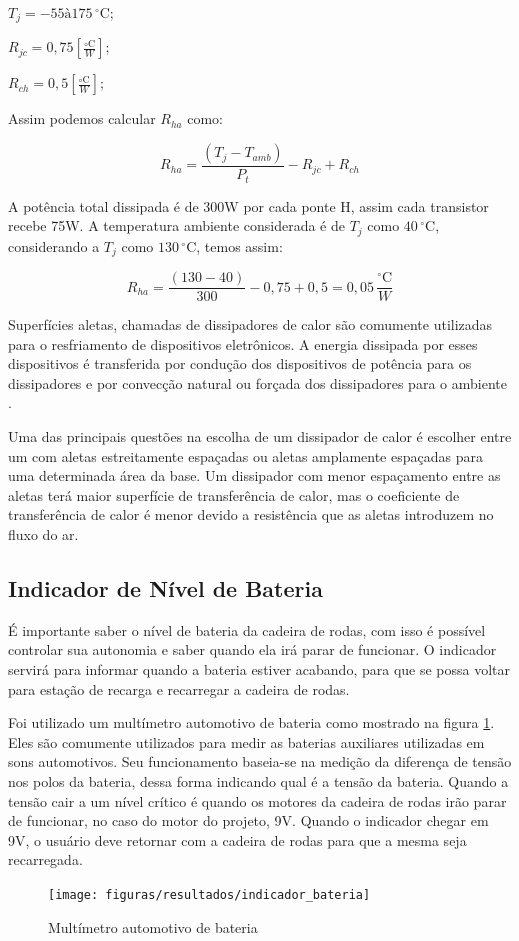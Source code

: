 $T_j = -55 à 175\,^{\circ}\mathrm{C}$;

$R_{jc} = 0,75[\frac{{\circ}\mathrm{C}}{W}]$;

$R_{ch} = 0,5[\frac{{\circ}\mathrm{C}}{W}]$;

Assim podemos calcular $R_{ha}$ como:

\begin{equation}
 R_{ha} = \frac{(T_j - T_{amb})}{P_t} - R_{jc} + R_{ch}
\end{equation}

A potência total dissipada é de 300W por cada ponte H, assim cada transistor recebe 75W. A
temperatura ambiente considerada é de $T_j$ como $40\,^{\circ}\mathrm{C}$, considerando a $T_j$ como $130\,^{\circ}\mathrm{C}$,
temos assim:

\begin{equation}
 R_{ha} = \frac{(130 - 40)}{300} - 0,75 + 0,5 = 0,05\,\frac{^{\circ}\mathrm{C}}{{W}}
\end{equation}

Superfícies aletas, chamadas de dissipadores de calor são
comumente utilizadas para o resfriamento de dispositivos eletrônicos. A energia dissipada por
esses dispositivos é transferida por condução dos dispositivos de potência para os dissipadores
e por convecção natural ou forçada dos dissipadores para o ambiente \cite[p.~434-439]{cengel}.

Uma das principais questões na escolha de um dissipador de calor é escolher entre um com
aletas estreitamente espaçadas ou aletas amplamente espaçadas para uma determinada área
da base. Um dissipador com menor espaçamento entre as aletas terá maior superfície de
transferência de calor, mas o coeficiente de transferência de calor é menor devido a
resistência que as aletas introduzem no fluxo do ar.

\subsection{Indicador de Nível de Bateria}

É importante saber o nível de bateria da cadeira de rodas, com isso é possível controlar sua autonomia e saber quando ela irá parar de funcionar. O indicador servirá para informar quando a bateria estiver acabando, para que se possa voltar para estação de recarga e recarregar a cadeira de rodas.

Foi utilizado um multímetro automotivo de bateria como mostrado na figura \ref{fig:indicador_bateria}. Eles são comumente utilizados para medir as baterias auxiliares utilizadas em sons automotivos. Seu funcionamento baseia-se na medição da diferença de tensão nos polos da bateria, dessa forma indicando qual é a tensão da bateria. Quando a tensão cair a um nível crítico é quando os motores da cadeira de rodas irão parar de funcionar, no caso do motor do projeto, 9V. Quando o indicador chegar em 9V, o usuário deve retornar com a cadeira de rodas para que a mesma seja recarregada.

\begin{figure}[!ht]
  \center
  \texttt{[image: figuras/resultados/indicador\_bateria]}
  \caption{Multímetro automotivo de bateria}
  \label{fig:indicador_bateria}
\end{figure}
